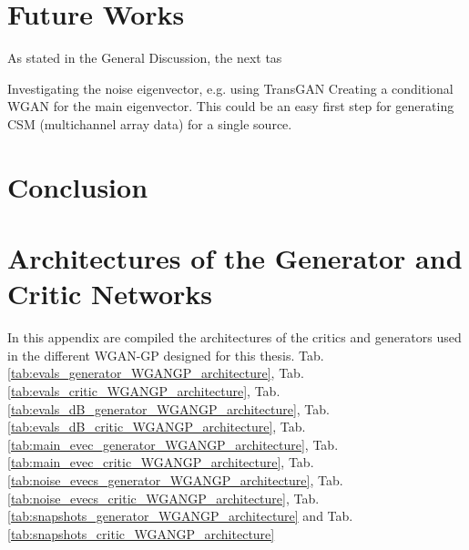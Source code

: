 \documentclass[11pt,a4paper,twoside]{report}
\begin{document}
\chapter{Future Works}

As stated in the General Discussion, the next tas 


Investigating the noise eigenvector, e.g. using TransGAN
Creating a conditional WGAN for the main eigenvector. This could be an easy first step for generating CSM (multichannel array data) for a single source.

\chapter{Conclusion}



\cleardoublepage

\appendix
\fancyhead[LO]{\rightmark}
\fancyhead[RO]{\scshape\appendixname\ \thechapter}
\fancyhead[LE]{\scshape\appendixname\ \thechapter}
\fancyhead[RE]{\textsc{\leftmark}}


\chapter[Architectures of the Different Networks]{Architectures of the Generator and Critic Networks}

In this appendix are compiled the architectures of the critics and generators used in the different WGAN-GP designed for this thesis.
Tab.\ref{tab:evals_generator_WGANGP_architecture}, Tab.\ref{tab:evals_critic_WGANGP_architecture}, Tab.\ref{tab:evals_dB_generator_WGANGP_architecture}, Tab.\ref{tab:evals_dB_critic_WGANGP_architecture}, Tab.\ref{tab:main_evec_generator_WGANGP_architecture}, Tab.\ref{tab:main_evec_critic_WGANGP_architecture}, Tab.\ref{tab:noise_evecs_generator_WGANGP_architecture}, Tab.\ref{tab:noise_evecs_critic_WGANGP_architecture}, Tab.\ref{tab:snapshots_generator_WGANGP_architecture} and Tab.\ref{tab:snapshots_critic_WGANGP_architecture}
\end{document}
